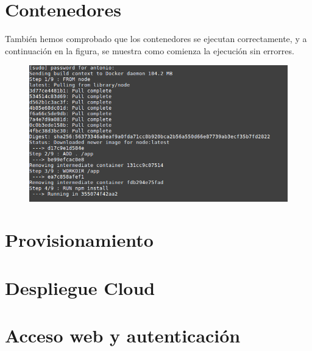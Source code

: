 \section {Contenedores}
También hemos comprobado que los contenedores se ejecutan correctamente, y a continuación en la figura, se muestra como comienza la ejecución sin errorres.
\begin{figure}
  \begin{center}
    \includegraphics[width=\textwidth]{imagenes/docker.png}
    \caption{}
    \label{fig:}
  \end{center}
\end{figure}
\section {Provisionamiento}
\section {Despliegue Cloud}
\section {Acceso web y autenticación}
